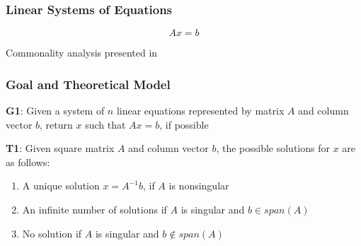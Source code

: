 \documentclass[t,12pt,numbers,fleqn]{beamer}
\begin{document}

\begin{frame}
\frametitle{Linear Systems of Equations}

$$A x = b$$

Commonality analysis presented in \cite{Smith2006}

\end{frame}







\begin{frame}

\frametitle{Goal and Theoretical Model}

\textbf{G1}: Given a system of $n$
linear equations represented by matrix $A$ and column vector $b$, return $x$ such that $A x = b$, if possible

\textbf{T1}: Given square matrix $A$ and column vector $b$, the possible
solutions for $x$ are as follows:

\begin{enumerate}
\item A unique solution $x = A^{-1} b$, if $A$ is nonsingular
\item An infinite number of solutions if $A$ is singular and $b \in span(A)$
\item No solution if $A$ is singular and $b \notin span(A)$
\end{enumerate}

\end{frame}
\end{document}

